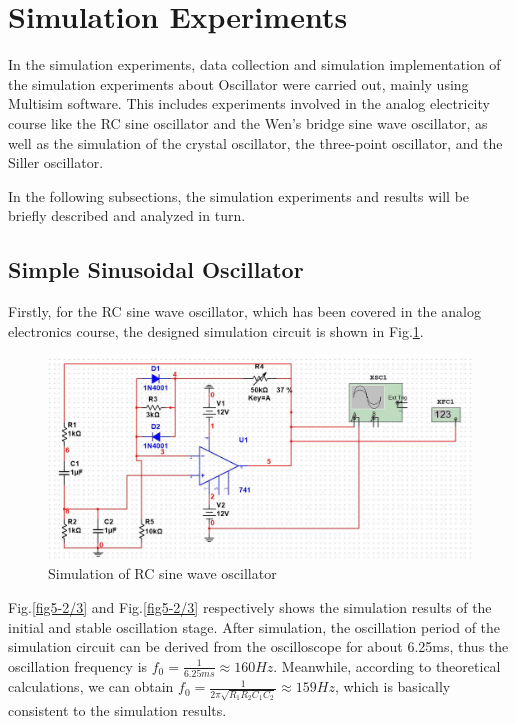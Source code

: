 \documentclass[conference]{IEEEtran}
\begin{document}
\section{Simulation Experiments}\label{sec5}
In the simulation experiments, data collection and simulation implementation of the simulation experiments about Oscillator were carried out, mainly using Multisim software. This includes experiments involved in the analog electricity course like the RC sine oscillator and the Wen’s bridge sine wave oscillator, as well as the simulation of the crystal oscillator, the three-point oscillator, and the Siller oscillator.

In the following subsections, the simulation experiments and results will be briefly described and analyzed in turn. 

\subsection{Simple Sinusoidal Oscillator}
Firstly, for the RC sine wave oscillator, which has been covered in the analog electronics course, the designed simulation circuit is shown in Fig.\ref{fig5-1}. 
\begin{figure}[!h]
\centerline{\includegraphics[scale=0.2]{fig/pic5-1.jpg}}
\caption{Simulation of RC sine wave oscillator}
\label{fig5-1}
\end{figure}

Fig.\ref{fig5-2/3} and Fig.\ref{fig5-2/3} respectively shows the simulation results of the initial and stable oscillation stage. After simulation, the oscillation period of the simulation circuit can be derived from the oscilloscope for about 6.25ms, thus the oscillation frequency is $f_0=\frac{1}{6.25ms}\approx 160Hz$. Meanwhile, according to theoretical calculations, we can obtain $f_0=\frac{1}{2\pi\sqrt{R_1R_2C_1C_2}}\approx159Hz$, which is basically consistent to the simulation results. 
\end{document}
